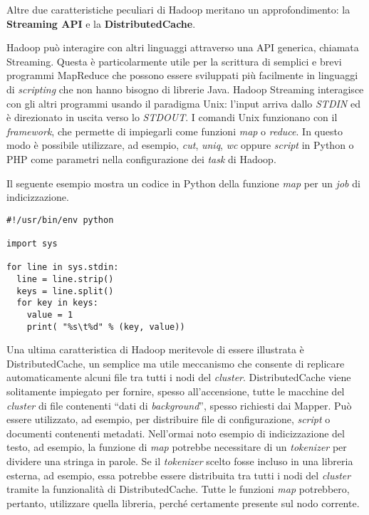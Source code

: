 Altre due caratteristiche peculiari di Hadoop meritano un approfondimento: la \textbf{Streaming API} e la \textbf{DistributedCache}.

Hadoop può interagire con altri linguaggi attraverso una API generica, chiamata Streaming. Questa è particolarmente utile per la scrittura di semplici e brevi programmi MapReduce 
che possono essere sviluppati più facilmente in linguaggi di \textit{scripting} che non hanno bisogno di librerie Java. Hadoop Streaming interagisce con gli altri programmi usando il 
paradigma Unix: l’input arriva dallo \textit{STDIN} ed è direzionato in uscita verso lo \textit{STDOUT}. I comandi Unix funzionano con il \textit{framework}, che permette di impiegarli come funzioni \textit{map} 
o \textit{reduce}. In questo modo è possibile utilizzare, ad esempio, \textit{cut}, \textit{uniq}, \textit{wc} oppure \textit{script} in Python o PHP come parametri nella configurazione dei \textit{task} di Hadoop.

Il seguente esempio mostra un codice in Python della funzione \textit{map} per un \textit{job} di indicizzazione.

\begin{lstlisting}[frame=single]
#!/usr/bin/env python
     
import sys
     
for line in sys.stdin:
  line = line.strip()
  keys = line.split()
  for key in keys:
    value = 1
    print( "%s\t%d" % (key, value))
\end{lstlisting}

Una ultima caratteristica di Hadoop meritevole di essere illustrata è DistributedCache, un semplice ma utile meccanismo che consente di replicare automaticamente alcuni file 
tra tutti i nodi del \textit{cluster}. DistributedCache viene solitamente impiegato per fornire, spesso all’accensione, tutte le macchine del \textit{cluster} di file contenenti “dati di \textit{background}”, 
spesso richiesti dai Mapper. Può essere utilizzato, ad esempio, per distribuire file di configurazione, \textit{script} o documenti contenenti metadati. Nell’ormai noto esempio di indicizzazione 
del testo, ad esempio, la funzione di \textit{map} potrebbe necessitare di un \textit{tokenizer} per dividere una stringa in parole. Se il \textit{tokenizer} scelto fosse incluso in una libreria esterna, 
ad esempio, essa potrebbe essere distribuita tra tutti i nodi del \textit{cluster} tramite la funzionalità di DistributedCache. Tutte le funzioni \textit{map} potrebbero, pertanto, utilizzare quella 
libreria, perché certamente presente sul nodo corrente.

